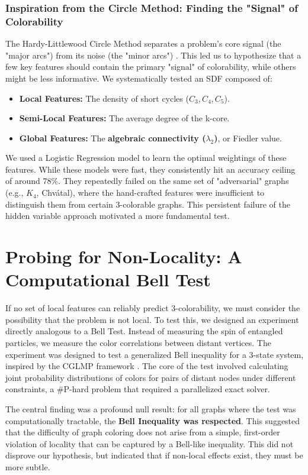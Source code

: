 \documentclass[12pt, letterpaper]{article}
\begin{document}
\subsubsection{Inspiration from the Circle Method: Finding the "Signal" of Colorability}
The Hardy-Littlewood Circle Method separates a problem's core signal (the "major arcs") from its noise (the "minor arcs") \cite{hardy1918asymptotic}. This led us to hypothesize that a few key features should contain the primary "signal" of colorability, while others might be less informative. We systematically tested an SDF composed of:
\begin{itemize}
    \item \textbf{Local Features:} The density of short cycles ($C_3, C_4, C_5$).
    \item \textbf{Semi-Local Features:} The average degree of the k-core.
    \item \textbf{Global Features:} The \textbf{algebraic connectivity ($\lambda_2$)}, or Fiedler value.
\end{itemize}
We used a Logistic Regression model to learn the optimal weightings of these features. While these models were fast, they consistently hit an accuracy ceiling of around 78\%. They repeatedly failed on the same set of "adversarial" graphs (e.g., $K_4$, Chvátal), where the hand-crafted features were insufficient to distinguish them from certain 3-colorable graphs. This persistent failure of the hidden variable approach motivated a more fundamental test.

\section{Probing for Non-Locality: A Computational Bell Test}

If no set of local features can reliably predict 3-colorability, we must consider the possibility that the problem is not local. To test this, we designed an experiment directly analogous to a Bell Test. Instead of measuring the spin of entangled particles, we measure the color correlations between distant vertices. The experiment was designed to test a generalized Bell inequality for a 3-state system, inspired by the CGLMP framework \cite{collins2002bell}. The core of the test involved calculating joint probability distributions of colors for pairs of distant nodes under different constraints, a \#P-hard problem that required a parallelized exact solver.

The central finding was a profound null result: for all graphs where the test was computationally tractable, the \textbf{Bell Inequality was respected}. This suggested that the difficulty of graph coloring does not arise from a simple, first-order violation of locality that can be captured by a Bell-like inequality. This did not disprove our hypothesis, but indicated that if non-local effects exist, they must be more subtle.
\end{document}
